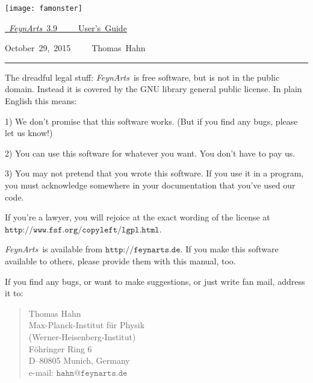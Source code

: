 \documentclass[twoside,12pt]{article}
\def\FA{\textit{FeynArts}}
\def\Code#1{\ensuremath{\texttt{#1}}}
\begin{document}
\thispagestyle{empty}

\vspace*{.2\textheight}

\hfill\texttt{[image: famonster]}

\bigskip\bigskip

\hfill\hbox{\underline{%
\vrule width 0pt height 0pt depth 2ex%
\Huge \FA\ 3.9~~~~~User's Guide}}

\vspace*{1ex}

\hfill\hbox{October 29, 2015~~~~~Thomas Hahn}

\clearpage

\vspace*{.5\textheight}
\vfill

\hrule

\medskip

\begin{scriptsize}
The dreadful legal stuff:
\FA\ is free software, but is not in the public domain.
Instead it is covered by the GNU library general public license.
In plain English this means:

1) We don't promise that this software works.   
(But if you find any bugs, please let us know!)

2) You can use this software for whatever you want.
You don't have to pay us.

3) You may not pretend that you wrote this software.
If you use it in a program, you must acknowledge
somewhere in your documentation that you've used  
our code.

If you're a lawyer, you will rejoice at the exact wording of the license 
at \Code{http://www.fsf.org/copyleft/lgpl.html}.

\FA\ is available from \Code{http://feynarts.de}.  If you make this
software available to others, please provide them with this manual, too.

If you find any bugs, or want to make suggestions, or just write fan mail,
address it to:
\vspace*{-2ex}
\begin{quote}
Thomas Hahn \\
Max-Planck-Institut f\"ur Physik \\
(Werner-Heisenberg-Institut) \\
F\"ohringer Ring 6 \\
D--80805 Munich, Germany \\
e-mail: \Code{hahn@feynarts.de}
\end{quote}
\end{scriptsize}
\end{document}
